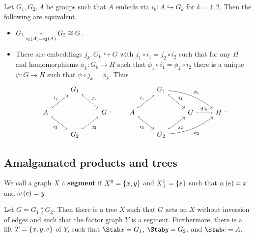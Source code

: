 \pagebreak

\begin{fact}
Let $ G_1, G_2, A $ be groups such that $ A $ embeds via $ i_k : A \hookrightarrow G_k $ for $ k = 1, 2 $. Then the following are equivalent.
\begin{itemize}
\item $ G_1 \underset{i_1\br{A} = i_2\br{A}}{*} G_2 \cong G $.
\item There are embeddings $ j_k : G_k \hookrightarrow G $ with $ j_1 \circ i_1 = j_2 \circ i_2 $ such that for any $ H $ and homomorphisms $ \phi_k : G_k \to H $ such that $ \phi_1 \circ i_1 = \phi_2 \circ i_2 $ there is a unique $ \psi : G \to H $ such that $ \psi \circ j_k = \phi_k $. Thus
$$
\begin{tikzcd}
& G_1 \arrow[dashed, hookrightarrow]{dr}{j_1} & \\
A \arrow[hookrightarrow]{ur}{i_1} \arrow[hookrightarrow, swap]{dr}{i_2} & & G \\
& G_2 \arrow[dashed, hookrightarrow, swap]{ur}{j_2} &
\end{tikzcd},
\qquad
\begin{tikzcd}
& G_1 \arrow[hookrightarrow]{dr}{j_1} \arrow[bend left=15]{drr}{\phi_1} & & \\
A \arrow[hookrightarrow]{ur}{i_1} \arrow[hookrightarrow, swap]{dr}{i_2} & & G \arrow[dashed]{r}{\exists !\psi} & H \\
& G_2 \arrow[hookrightarrow, swap]{ur}{j_2} \arrow[bend right=15, swap]{urr}{\phi_2} & &
\end{tikzcd}.
$$
\end{itemize}
\end{fact}

\subsection{Amalgamated products and trees}

\begin{definition}
We call a graph $ X $ a \textbf{segment} if $ X^0 = \cbr{x, y} $ and $ X_+^1 = \cbr{e} $ such that $ \alpha\br{e} = x $ and $ \omega\br{e} = y $.
\end{definition}

\begin{theorem}
Let $ G = G_1 \underset{A}{*} G_2 $. Then there is a tree $ X $ such that $ G $ acts on $ X $ without inversion of edges and such that the factor graph $ Y $ is a segment. Furthermore, there is a lift $ T = \cbr{x, y, e} $ of $ Y $, such that $ \Stab x = G_1 $, $ \Stab y = G_2 $, and $ \Stab e = A $.
\end{theorem}

